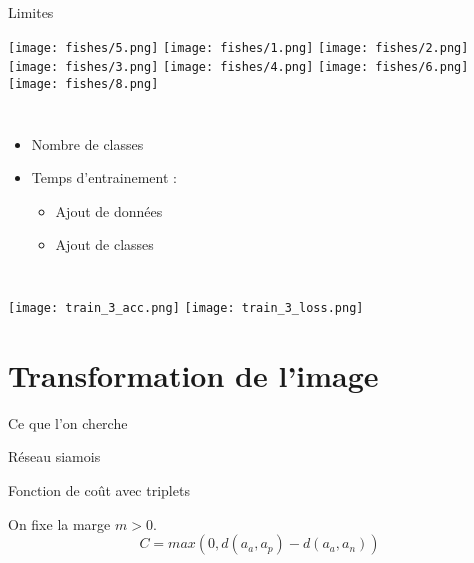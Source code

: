 \documentclass{falconbeamer}
\begin{document}
\begin{frame}{Limites}
	\begin{center}
		\texttt{[image: fishes/5.png]}
		\texttt{[image: fishes/1.png]}
		\texttt{[image: fishes/2.png]}
		\texttt{[image: fishes/3.png]}
		\texttt{[image: fishes/4.png]}
		\texttt{[image: fishes/6.png]}
		\texttt{[image: fishes/8.png]}
	\end{center}

	\begin{columns}
		\begin{itemize}
			\item Nombre de classes
			\item Temps d'entrainement :
			\begin{itemize}
				\item Ajout de données
				\item Ajout de classes
			\end{itemize}
		\end{itemize}
	\end{columns}

	\begin{center}
		\texttt{[image: train\_3\_acc.png]}
		\texttt{[image: train\_3\_loss.png]}
	\end{center}
\end{frame}

\section{Transformation de l'image}

\begin{frame}{Ce que l'on cherche}
\end{frame}

\begin{frame}{Réseau siamois}
	\begin{center}
	\end{center}
\end{frame}

\begin{frame}{Fonction de coût avec triplets}
	\begin{center}
	\end{center}
	On fixe la marge $m > 0$.
	$$
		C=max(0, d(a_a, a_p)-d(a_a, a_n))
	$$
\end{frame}
\end{document}
